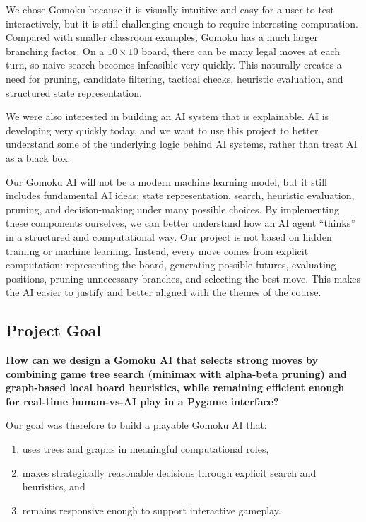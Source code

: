\documentclass[11pt]{article}
\begin{document}
We chose Gomoku because it is visually intuitive and easy for a user to test interactively, but it is still challenging enough to require interesting computation. Compared with smaller classroom examples, Gomoku has a much larger branching factor. On a \(10 \times 10\) board, there can be many legal moves at each turn, so naive search becomes infeasible very quickly. This naturally creates a need for pruning, candidate filtering, tactical checks, heuristic evaluation, and structured state representation.

We were also interested in building an AI system that is explainable. AI is developing very quickly today, and we want to use this project to better understand some of the underlying logic behind AI systems, rather than treat AI as a black box.

Our Gomoku AI will not be a modern machine learning model, but it still includes fundamental AI ideas: state representation, search, heuristic evaluation, pruning, and decision-making under many possible choices. By implementing these components ourselves, we can better understand how an AI agent ``thinks'' in a structured and computational way. Our project is not based on hidden training or machine learning. Instead, every move comes from explicit computation: representing the board, generating possible futures, evaluating positions, pruning unnecessary branches, and selecting the best move. This makes the AI easier to justify and better aligned with the themes of the course.\cite{handout}

\subsection*{Project Goal}

\textbf{How can we design a Gomoku AI that selects strong moves by combining game tree search (minimax with alpha-beta pruning) and graph-based local board heuristics, while remaining efficient enough for real-time human-vs-AI play in a Pygame interface?}

Our goal was therefore to build a playable Gomoku AI that:
\begin{enumerate}
    \item uses trees and graphs in meaningful computational roles,
    \item makes strategically reasonable decisions through explicit search and heuristics, and
    \item remains responsive enough to support interactive gameplay.
\end{enumerate}
\end{document}
